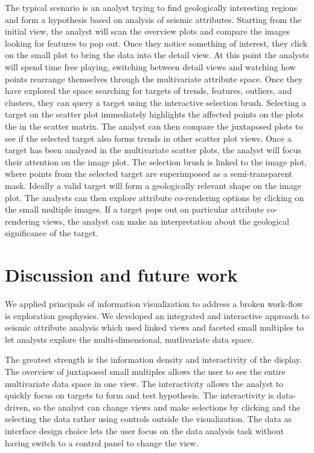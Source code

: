 \documentclass[journal]{vgtc}                %
\begin{document}
The typical scenario is an analyst trying to find geologically interesting regions and form
a hypothesis based on analysis of seismic attributes. Starting from
the initial view, the analyst will scan the overview plots and compare the images looking
for features to pop out. Once they notice something of interest, they click on the
small plot to bring the data into the detail view. At this point the analysts will spend
time free playing, switching between detail views and watching how points rearrange
themselves through the multivariate attribute space. Once they have explored the space
searching for targets of trends, features, outliers, and clusters, they can query a target
using the interactive selection brush. Selecting a target on the scatter plot immediately highlights
the affected points on the plots the in the scatter matrix. The analyst can then compare
the juxtaposed plots to see if the selected target also forms trends in other scatter plot
views. Once a target has been analyzed in the multivariate scatter plots, the analyst
will focus their attention on the image plot. The selection brush is linked to the
image plot, where points from the selected target are superimposed as a semi-transparent
mask. Ideally a valid target will form a geologically relevant shape on the image plot.
The analysts can then explore attribute co-rendering options by clicking on the small multiple
images. If a target pops out on particular attribute co-rendering views, the analyst
can make an interpretation about the geological significance of the target.

\section{Discussion and future work}
We applied principals of information visualization to address a broken
work-flow is exploration geophysics. We developed an integrated and interactive
approach to seismic attribute analysis which used linked views and faceted small
multiples to let analysts explore the multi-dimensional, mutlivariate data space.

The greatest strength is the information density and interactivity of the display. The overview 
of juxtaposed small multiples allows the user to see the entire multivariate data space
in one view. The interactivity allows the analyst to quickly focus on targets to form and
test hypothesis. The interactivity is data-driven, so the analyst can change views and make
selections by clicking and the selecting the data rather using controls outside the visualization. 
The data as interface design choice lets the user focus on the data analysis task without having switch
to a control panel to change the view.
\end{document}
